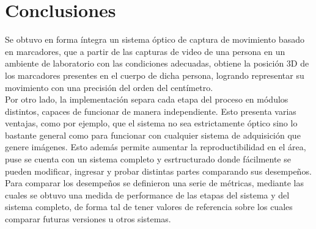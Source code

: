 \section{Conclusiones}

Se obtuvo en forma íntegra un sistema óptico de captura de movimiento basado en marcadores, que a partir de las capturas de video de una persona en un ambiente de laboratorio con las condiciones adecuadas, obtiene la posición 3D de  los marcadores presentes en el cuerpo de dicha persona, logrando representar su movimiento con una precisión del orden del centímetro.\\
%
Por otro lado, la implementación separa cada etapa del proceso en módulos distintos, capaces de funcionar de manera independiente. Esto presenta varias ventajas, como por ejemplo, que el sistema no sea estrictamente óptico sino lo bastante general como para funcionar con cualquier sistema de adquisición que genere imágenes. Esto además permite aumentar la reproductibilidad en el área, puse se cuenta con un sistema completo y esrtructurado donde fácilmente se pueden modificar, ingresar y probar distintas partes comparando sus desempeños.\\
Para comparar los desempeños se definieron una serie de métricas, mediante las cuales se obtuvo una medida de performance de las etapas del sistema y del sistema completo, de forma tal de tener valores de referencia sobre los cuales comparar futuras versiones u otros sistemas.